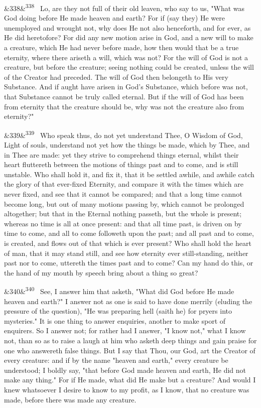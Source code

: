 \documentclass[12pt]{article}
\newcommand{\para}[1][]{\par\noindent\ifx&#1&\else\textsuperscript{\footnotesize #1}~\fi}
\begin{document}
\para[338] Lo, are they not full of their old leaven, who say to us, "What was God doing before He made heaven and earth? For if (say they) He were unemployed and wrought not, why does He not also henceforth, and for ever, as He did heretofore? For did any new motion arise in God, and a new will to make a creature, which He had never before made, how then would that be a true eternity, where there ariseth a will, which was not? For the will of God is not a creature, but before the creature; seeing nothing could be created, unless the will of the Creator had preceded. The will of God then belongeth to His very Substance. And if aught have arisen in God's Substance, which before was not, that Substance cannot be truly called eternal. But if the will of God has been from eternity that the creature should be, why was not the creature also from eternity?"

\para[339] Who speak thus, do not yet understand Thee, O Wisdom of God, Light of souls, understand not yet how the things be made, which by Thee, and in Thee are made: yet they strive to comprehend things eternal, whilst their heart fluttereth between the motions of things past and to come, and is still unstable. Who shall hold it, and fix it, that it be settled awhile, and awhile catch the glory of that ever-fixed Eternity, and compare it with the times which are never fixed, and see that it cannot be compared; and that a long time cannot become long, but out of many motions passing by, which cannot be prolonged altogether; but that in the Eternal nothing passeth, but the whole is present; whereas no time is all at once present: and that all time past, is driven on by time to come, and all to come followeth upon the past; and all past and to come, is created, and flows out of that which is ever present? Who shall hold the heart of man, that it may stand still, and see how eternity ever still-standing, neither past nor to come, uttereth the times past and to come? Can my hand do this, or the hand of my mouth by speech bring about a thing so great?

\para[340] See, I answer him that asketh, "What did God before He made heaven and earth?" I answer not as one is said to have done merrily (eluding the pressure of the question), "He was preparing hell (saith he) for pryers into mysteries." It is one thing to answer enquiries, another to make sport of enquirers. So I answer not; for rather had I answer, "I know not," what I know not, than so as to raise a laugh at him who asketh deep things and gain praise for one who answereth false things. But I say that Thou, our God, art the Creator of every creature: and if by the name "heaven and earth," every creature be understood; I boldly say, "that before God made heaven and earth, He did not make any thing." For if He made, what did He make but a creature? And would I knew whatsoever I desire to know to my profit, as I know, that no creature was made, before there was made any creature.
\end{document}
